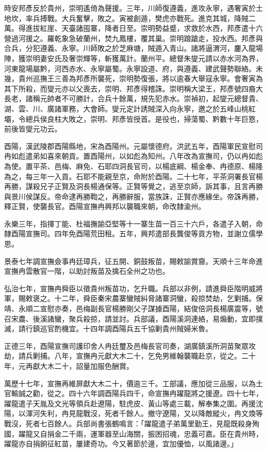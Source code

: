\begin{pinyinscope}
時安邦彥反於貴州，崇明遙倚為聲援。三年，川師復遵義，進攻永寧，遇奢寅於土地坎，率兵搏戰。大兵奮擊，敗之。寅被創遁，樊虎亦戰死。進克其城，降賊二萬。得進拔紅崖、天臺諸囤寨，降者日至。崇明勢益蹙，求救於水西，邦彥遣十六營過河援之。羅乾象急破蘭州，焚九鳳樓，覆其巢。崇明踉蹌走，投水西。邦彥與合兵，分犯遵義、永寧。川師敗之於芝麻塘，賊遁入青山。諸將逼渭河，鏖入龍場陣，獲崇明妻安氏及奢崇輝等，斬獲萬計。蘭州平。總督朱燮元請以赤水河為界，河東龍場屬黔，河西赤水、永寧屬蜀。永寧設道、府，與遵義、建武聲勢聯絡。未幾，貴州巡撫王三善為邦彥所襲死，崇明勢復張，將以逾春大舉寇永寧。會奢寅為其下所殺，而燮元亦以父喪去，崇明、邦彥得稽誅。崇明稱大梁王，邦彥號四裔大長老，諸稱元帥者不可勝計，合兵十餘萬，規先犯赤水。崇禎初，起燮元總督貴、湖、雲、川、廣諸軍務，大會師。燮元定計誘賊深入向永寧，邀之於五峰山桃紅壩，令總兵侯良柱大敗之，崇明、邦彥皆授首。是役也，掃蕩蜀、黔數十年巨憝，前後皆燮元功云。

酉陽，漢武陵郡酉陽縣地，宋為酉陽州。元屬懷德府。洪武五年，酉陽軍民宣慰司冉如彪遣弟如喜來朝貢。置酉陽州，以如彪為知州。八年改為宣撫司，仍以冉如彪為使。置平茶、邑梅、麻免、石耶四洞長官司，以楊底綱、楊金奉、冉德原、楊隆為之，每三年一入貢。石耶不能親至京，命附於酉陽。二十七年，平茶洞署長官楊再勝，謀殺兄子正賢及洞長楊通保等。正賢等覺之，逃至京師，訴其事，且言再勝與景川侯謀反。帝命逮再勝鞫之，再勝辭服，當族誅，正賢亦應緣坐。帝誅再勝，釋正賢，使襲長官。酉陽宣撫冉興邦以襲職來朝，命改隸渝州。

永樂三年，指揮丁能、杜福撫諭亞堅等十一寨生苗一百三十六戶，各遣子入朝，命隸酉陽宣撫司。四年免酉陽荒田租。五年，興邦遣部長龔俊等貢方物，並謝立儒學恩。

景泰七年調宣撫僉事冉廷璋兵，征五開、銅鼓叛苗，賜敕諭賞齎。天順十三年命進宣撫冉雲散官一階，以助討叛苗及擒石全州之功也。

弘治七年，宣撫冉舜臣以徵貴州叛苗功，乞升職。兵部以非例，請進舜臣階明威將軍，賜敕褒之。十二年，舜臣秦宋農寨蠻賊糾脅諸寨洞蠻，殺掠焚劫，乞剿捕。保靖、永順二宣慰亦奏，邑梅副長官楊勝剛父子謀據酉陽，結俊倍洞長楊廣震等，號召宋農、後溪諸蠻，聚兵殺掠，請並討。兵部議，酉陽溪洞連絡，易煽動，宜即撲滅，請行鎮巡官酌機宜。十四年調酉陽兵五千協剿貴州賊婦米魯。

正德三年，酉陽宣撫司護印舍人冉廷璽及邑梅長官司奏，湖廣鎮溪所洞苗聚眾攻劫，請兵剿捕。八年，宣撫冉元獻大木二十，乞免男維翰襲職赴京，從之。二十年，元再獻大木二十，詔量加服色酬賞。

萬歷十七年，宣撫再維屏獻大木二十，價逾三千。工部議，應加從三品服，以為土官輸誠之勸，從之。四十六年調酉陽兵四千，命宣撫冉躍龍將之援遼。四十七年，躍龍遣子天胤及文光等領兵赴遼陽，駐虎皮、黃山等處三載，解奉集之圍。再援沈陽，以渾河失利，冉見龍戰沒，死者千餘人。撤守遼陽，又以降敵縱火，冉文煥等戰沒，死者七百餘人。兵部尚書張鶴鳴言：「躍龍遣子弟萬里勤王，見龍既殺身殉國，躍龍又自捐金二千兩，運軍器至山海關，振困招魂，忠義可嘉。臣在貴州時，躍龍亦自捐餉征紅苗，屢建奇功。今又著節於邊，宜加優恤，以風諸邊。」


\end{pinyinscope}
